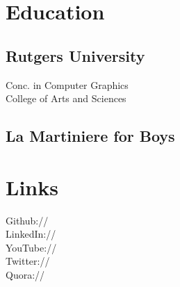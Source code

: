 \documentclass[]{deedy-resume-openfont}
\begin{document}
%
%
\lastupdated

%
%



%
%

\begin{minipage}[t]{0.33\textwidth} 


\section{Education} 

\subsection{Rutgers University}
\sectionsep


Conc. in Computer Graphics \\
College of Arts and Sciences \\
\sectionsep

\subsection{La Martiniere for Boys}
\sectionsep


\section{Links} 
Github:// \href{https://github.com/11}
{} \\
LinkedIn://  \href{https://www.linkedin.com/in/DougRudolphJr}{} \\
YouTube://  \href{https://www.youtube.com/user/DeedyDash007}{} \\
Twitter://  \href{https://twitter.com/debarghya_das}{} \\
Quora://  \href{https://www.quora.com/Debarghya-Das}{}
\sectionsep


\end{minipage}
\end{document}
